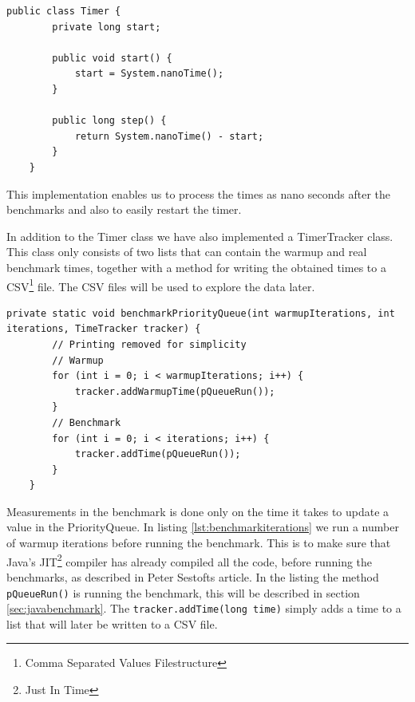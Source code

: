 \documentclass{article}
\begin{document}
\begin{lstlisting}[caption={Simple Timer class implementation},label={lst:timerclass}]
    public class Timer {
        private long start;

        public void start() {
            start = System.nanoTime();
        }

        public long step() {
            return System.nanoTime() - start;
        }
    }
\end{lstlisting}

This implementation enables us to process the times as nano seconds after 
the benchmarks and also to easily restart the timer.

In addition to the Timer class we have also implemented a TimerTracker class.
This class only consists of two lists that can contain the warmup and real 
benchmark times, together with a method for writing the obtained times to a CSV\footnote{Comma Separated Values Filestructure} file.
The CSV files will be used to explore the data later.

\begin{lstlisting}[caption={Benchmark iterations}, label={lst:benchmarkiterations}]
    private static void benchmarkPriorityQueue(int warmupIterations, int iterations, TimeTracker tracker) {
        // Printing removed for simplicity
        // Warmup
        for (int i = 0; i < warmupIterations; i++) {
            tracker.addWarmupTime(pQueueRun());
        }
        // Benchmark
        for (int i = 0; i < iterations; i++) {
            tracker.addTime(pQueueRun());
        }
    }
\end{lstlisting}

Measurements in the benchmark is done only on the time it takes to update 
a value in the PriorityQueue. In listing \ref{lst:benchmarkiterations} we run a number of warmup iterations before running the
benchmark. This is to make sure that Java's JIT\footnote{Just In Time} 
compiler has already compiled all the code, before running the benchmarks, as described in Peter Sestofts article\cite{microbenchmarks}. 
In the listing the method \lstinline{pQueueRun()} is running the benchmark, this will be described 
in section \ref{sec:javabenchmark}. The \lstinline{tracker.addTime(long time)} 
simply adds a time to a list that will later be written to a CSV file.

\end{document}
